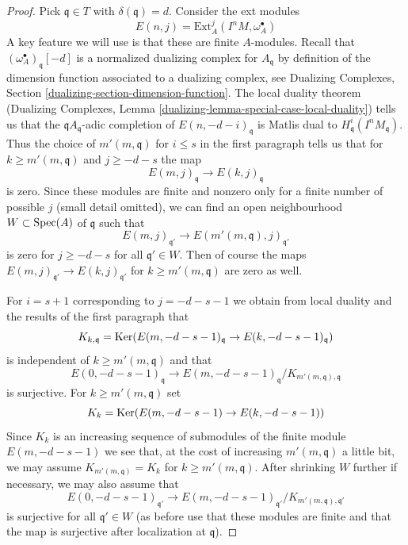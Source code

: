 \begin{proof}
\medskip\noindent
Pick $\mathfrak q \in T$ with $\delta(\mathfrak q) = d$.
Consider the ext modules
$$
E(n, j) = \text{Ext}^j_A(I^nM, \omega_A^\bullet)
$$
A key feature we will use is that these are finite $A$-modules.
Recall that $(\omega_A^\bullet)_\mathfrak q[-d]$ is a normalized
dualizing complex for $A_\mathfrak q$ by definition of the
dimension function associated to a dualizing complex, see
Dualizing Complexes, Section \ref{dualizing-section-dimension-function}.
The local duality theorem (Dualizing Complexes, Lemma
\ref{dualizing-lemma-special-case-local-duality}) tells us that
the $\mathfrak qA_\mathfrak q$-adic completion of
$E(n, -d - i)_\mathfrak q$ is Matlis dual to
$H^i_\mathfrak q(I^nM_\mathfrak q)$. Thus the choice of
$m'(m, \mathfrak q)$ for $i \leq s$ in the first paragraph tells us that
for $k \geq m'(m, \mathfrak q)$ and $j \geq -d - s$ the map
$$
E(m, j)_\mathfrak q \to E(k, j)_\mathfrak q
$$
is zero. Since these modules are finite and nonzero only
for a finite number of possible $j$ (small detail omitted),
we can find an open neighbourhood $W \subset \mathop{\mathrm{Spec}}(A)$ of $\mathfrak q$
such that
$$
E(m, j)_{\mathfrak q'} \to E(m'(m, \mathfrak q), j)_{\mathfrak q'}
$$
is zero for $j \geq -d - s$ for all $\mathfrak q' \in W$.
Then of course the maps $E(m, j)_{\mathfrak q'} \to E(k, j)_{\mathfrak q'}$
for $k \geq m'(m, \mathfrak q)$ are zero as well.

\medskip\noindent
For $i = s + 1$ corresponding to $j = - d - s - 1$ we obtain
from local duality and the results of the first paragraph that
$$
K_{k, \mathfrak q} =
\mathop{\mathrm{Ker}}(E(m, -d - s - 1)_\mathfrak q \to E(k, -d - s - 1)_\mathfrak q)
$$
is independent of $k \geq m'(m, \mathfrak q)$ and that
$$
E(0, -d - s - 1)_\mathfrak q \to
E(m, -d - s - 1)_\mathfrak q/K_{m'(m, \mathfrak q), \mathfrak q}
$$
is surjective. For $k \geq m'(m, \mathfrak q)$ set
$$
K_k = \mathop{\mathrm{Ker}}(E(m, -d - s - 1) \to E(k, -d - s - 1))
$$
Since $K_k$ is an increasing sequence of submodules of the finite
module $E(m, -d - s - 1)$ we see that, at the cost of increasing
$m'(m, \mathfrak q)$ a little bit, we may assume
$K_{m'(m, \mathfrak q)} = K_k$ for $k \geq m'(m, \mathfrak q)$.
After shrinking $W$ further if necessary, we may also assume that
$$
E(0, -d - s - 1)_{\mathfrak q'} \to
E(m, -d - s - 1)_{\mathfrak q'}/K_{m'(m, \mathfrak q), \mathfrak q'}
$$
is surjective for all $\mathfrak q' \in W$ (as before use that
these modules are finite
and that the map is surjective after localization at $\mathfrak q$).


\end{proof}

